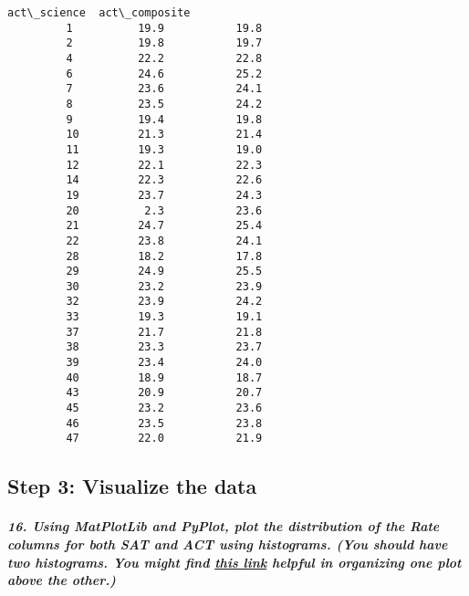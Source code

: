 \documentclass[11pt]{article}
\begin{document}
\begin{Verbatim}[commandchars=\\\{\}]
             act\_science  act\_composite  
         1          19.9           19.8  
         2          19.8           19.7  
         4          22.2           22.8  
         6          24.6           25.2  
         7          23.6           24.1  
         8          23.5           24.2  
         9          19.4           19.8  
         10         21.3           21.4  
         11         19.3           19.0  
         12         22.1           22.3  
         14         22.3           22.6  
         19         23.7           24.3  
         20          2.3           23.6  
         21         24.7           25.4  
         22         23.8           24.1  
         28         18.2           17.8  
         29         24.9           25.5  
         30         23.2           23.9  
         32         23.9           24.2  
         33         19.3           19.1  
         37         21.7           21.8  
         38         23.3           23.7  
         39         23.4           24.0  
         40         18.9           18.7  
         43         20.9           20.7  
         45         23.2           23.6  
         46         23.5           23.8  
         47         22.0           21.9  
\end{Verbatim}
            
    \subsection{Step 3: Visualize the data}\label{step-3-visualize-the-data}

    \subparagraph{\texorpdfstring{16. Using MatPlotLib and PyPlot, plot the
distribution of the Rate columns for both SAT and ACT using histograms.
(You should have two histograms. You might find
\href{https://matplotlib.org/users/pyplot_tutorial.html\#working-with-multiple-figures-and-axes}{this
link} helpful in organizing one plot above the
other.)}{16. Using MatPlotLib and PyPlot, plot the distribution of the Rate columns for both SAT and ACT using histograms. (You should have two histograms. You might find this link helpful in organizing one plot above the other.)}}\label{using-matplotlib-and-pyplot-plot-the-distribution-of-the-rate-columns-for-both-sat-and-act-using-histograms.-you-should-have-two-histograms.-you-might-find-this-link-helpful-in-organizing-one-plot-above-the-other.}
\end{document}
